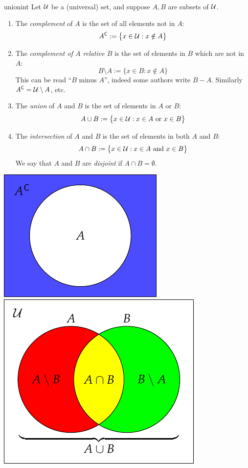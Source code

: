 \begin{defn}{}{unionint}
	Let $\mathcal{U}$ be a (universal) set,\footnotemark{} and suppose $A,B$ are subsets of $\mathcal{U}$.
	\begin{enumerate}
	  \item The \emph{complement} of $A$ is the set of all elements not in $A$:
		\[
			{A}^{\mathsf{C}}:=\bigl\{x\in\mathcal{U}:x\notin A\bigr\}
		\]
		\item The \emph{complement of $A$ relative $B$} is the set of elements in $B$ which are not in $A$:
		\[
			B\setminus A:=\bigl\{x\in B:x\notin A\bigr\}
		\]
		This can be read ``$B$ minus $A$'', indeed some authors write $B-A$. Similarly ${A}^{\mathsf{C}}=\mathcal{U}\setminus A$, etc.
		\item The \emph{union} of $A$ and $B$ is the set of elements in $A$ or $B$:
		\[
			A\cup B:=\bigl\{x\in\mathcal{U}:x\in A\text{ or }x\in B\bigr\}
		\]
		\item The \emph{intersection} of $A$ and $B$ is the set of elements in both $A$ and $B$:
		\[
			A\cap B:=\bigl\{x\in\mathcal{U}:x\in A\text{ and }x\in B\bigr\}
		\]
		We say that $A$ and $B$ are \emph{disjoint} if $A\cap B=\emptyset$.
	\end{enumerate}
	
	\begin{center}
			\includegraphics{sets-05-venncomp}
		\qquad\qquad
			\includegraphics{sets-04-vennunion}
	\end{center}
\end{defn}

